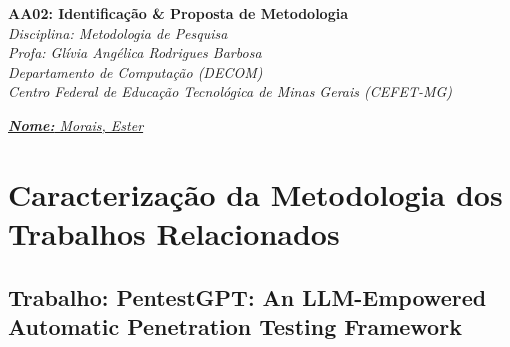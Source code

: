 \documentclass[12pt, a4paper]{article}
\begin{document}

\begin{center}
{\large\bfseries AA02: Identificação \& Proposta de Metodologia}\\[0.3em]
\textit{Disciplina: Metodologia de Pesquisa}\\
\textit{Profa: Glívia Angélica Rodrigues Barbosa}\\
\textit{Departamento de Computação (DECOM)}\\
\textit{Centro Federal de Educação Tecnológica de Minas Gerais (CEFET-MG)}
\end{center}

\vspace{0.8em}
\underline{\textit{\textbf{Nome:} Morais, Ester}}

\vspace{1em}

\section{Caracterização da Metodologia dos Trabalhos Relacionados}

\subsection{Trabalho: PentestGPT: An LLM-Empowered Automatic Penetration Testing Framework}
\end{document}
